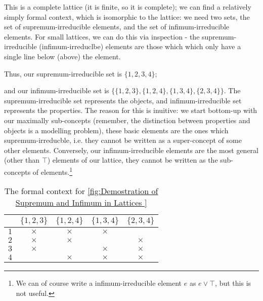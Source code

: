 This is a complete lattice (it is finite, so it is complete); we can find a relatively simply formal context, which is isomorphic to the lattice: we need two sets, the set of supremum-irreducible elements, and the set of infimum-irreducible elements. For small lattices, we can do this via inspection - the supremum-irreducible (infimum-irreduclbe) elements are those which which only have a single line below (above) the element. 

Thus, our supremum-irreducible set is $\{1,2,3,4\}$; 

and our infimum-irreducible set is $\{\{1,2,3\}, \{1,2,4\}, \{1,3,4\}, \{2,3,4\}\}$. The supremum-irreducible set represents the objects, and infimum-irreducible set represents the properties. The reason for this is inuitive: we start bottom-up with our maximally sub-concepts (remember, the distinction between properties and objects is a modelling problem), these basic elements are the ones which supremum-irreducble, i.e. they cannot be written as a super-concept of some other elements. Conversely, our infimum-irreducible elements are the most general (other than $\top$) elements of our lattice, they cannot be written as the sub-concepts of elements.\footnote{We can of course write a  infimum-irreducible element $e$ as $e \lor \top$, but this is not useful.} 

\begin{table}[h]
    \centering
    \caption{The formal context for \ref{fig:Demostration of Supremum and Infimum in Lattices }}
    \begin{tabular}{c|cccc} 
        & $\{1,2,3\}$ & $\{1,2,4\}$ & $\{1,3,4\}$ & $\{2,3,4\}$ \\ \hline
        $1$ & $\times$ & $\times$ & $\times$ & \\ 
        $2$ & $\times$ & $\times$ & & $\times$ \\ 
        $3$ & $\times$ & & $\times$ & $\times$ \\ 
        $4$ & & $\times$ & $\times$ & $\times$   
    \end{tabular}
\end{table}
